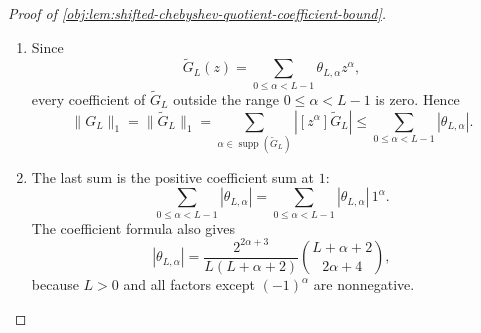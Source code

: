 \documentclass[11pt]{article}
\begin{document}
\begin{proof}[Proof of \cref{obj:lem:shifted-chebyshev-quotient-coefficient-bound}]
\begin{enumerate}
\[\binom{L+\nu}{2\nu}4^\nu z^\nu .
\]
The \(\nu=1\) term is \(-2L^2z\).  For the remaining terms write
\(\nu=\alpha+2\).  Then
\[
(-1)^{\alpha+2}\frac{L}{L+\alpha+2}
\binom{L+\alpha+2}{2\alpha+4}4^{\alpha+2}z^{\alpha+2}
=
2L^2\theta_{L,\alpha}z^{\alpha+2},
\]
so, with \(Q_L(z)=T_L(1-2z)\),
\[
Q_L(z)
=
1-2L^2z+2L^2z^2\widetilde G_L(z).
\]
Using these quotient identities, since \(Q_L(0)=1\), the polynomial
\[
H_L(z)=\frac{1-Q_L(z)}{2L^2}
\]
has zero constant term. Moreover \(Q_L'(0)=-2T_L'(1)=-2L^2\), so \(H_L'(0)=1\), and hence the quotient identity for \(E_L\) gives \(E_L(0)=1\). Thus \(1-E_L\) has zero constant term, as required for the quotient identity defining \(G_L\). Using the displayed formula for \(Q_L\),
\[
H_L(z)
=\frac{1-Q_L(z)}{2L^2}
=z-z^2\widetilde G_L(z)
=z(1-z\widetilde G_L(z)).
\]
Thus
\[
zE_L(z)=z(1-z\widetilde G_L(z)).
\]
Because multiplication by the nonzero indeterminate \(z\) is cancellative in \(\mathbb R[z]\),
\[
E_L(z)=1-z\widetilde G_L(z).
\]
Consequently
\[
zG_L(z)=1-E_L(z)=z\widetilde G_L(z),
\]
and the same cancellation gives
\[
G_L(z)=\widetilde G_L(z)
\]
as polynomials. %

\item Since
\[
\widetilde G_L(z)=\sum_{0\le \alpha<L-1}\theta_{L,\alpha}z^\alpha,
\]
every coefficient of \(\widetilde G_L\) outside the range \(0\le \alpha<L-1\) is zero. Hence
\[
\|G_L\|_1
=
\|\widetilde G_L\|_1
=
\sum_{\alpha\in\operatorname{supp}(\widetilde G_L)}
   |[z^\alpha]\widetilde G_L|
\le
\sum_{0\le \alpha<L-1}|\theta_{L,\alpha}|.
\]

\item The last sum is the positive coefficient sum at \(1\):
\[
\sum_{0\le \alpha<L-1}|\theta_{L,\alpha}|
=
\sum_{0\le \alpha<L-1}|\theta_{L,\alpha}|\,1^\alpha .
\]
The coefficient formula also gives
\[
|\theta_{L,\alpha}|
=
\frac{2^{2\alpha+3}}{L(L+\alpha+2)}
\binom{L+\alpha+2}{2\alpha+4},
\]
because \(L>0\) and all factors except \((-1)^\alpha\) are nonnegative. %


\end{enumerate}
\end{proof}
\end{document}
